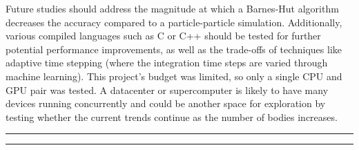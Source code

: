 \documentclass[12pt, letterpaper]{article}
\begin{document}
Future studies should address the magnitude at which a Barnes-Hut 
algorithm decreases the accuracy compared to a particle-particle 
simulation. Additionally, various compiled languages such as C or C++ 
should be tested for further potential performance improvements, as well 
as the trade-offs of techniques like adaptive time stepping (where the 
integration time steps are varied through machine learning). This 
project's budget was limited, so only a single CPU and GPU pair was 
tested. A datacenter or supercomputer is likely to have many devices 
running concurrently and could be another space for exploration by testing 
whether the current trends continue as the number of bodies increases.

\nocite{mathias_cbmos:_2022}
\nocite{lee_boosting_2014}
\nocite{lai_hybrid_2020}

\vspace{24pt}\hrule\vspace{1pt}\hrule\vspace{12pt}

\printbibliography
\end{document}
